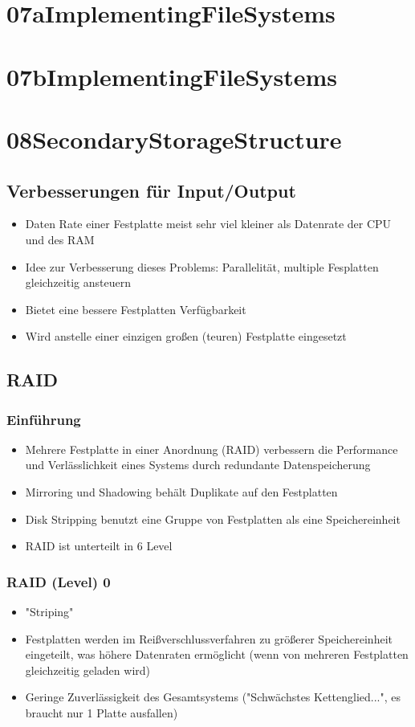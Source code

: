 \documentclass[a4paper]{scrreprt}
\begin{document}
\chapter{07aImplementingFileSystems}
\chapter{07bImplementingFileSystems}
\chapter{08SecondaryStorageStructure}
\section{Verbesserungen für Input/Output}
\begin{itemize}
	\item Daten Rate einer Festplatte meist sehr viel kleiner als Datenrate der CPU und des RAM
	\item Idee zur Verbesserung dieses Problems: Parallelität, multiple Fesplatten gleichzeitig ansteuern
	\item Bietet eine bessere Festplatten Verfügbarkeit
	\item Wird anstelle einer einzigen großen (teuren) Festplatte eingesetzt
\end{itemize}
\section{RAID}
\subsection{Einführung}
\begin{itemize}
	\item Mehrere Festplatte in einer Anordnung (RAID) verbessern die Performance und Verlässlichkeit eines Systems durch redundante Datenspeicherung
	\item Mirroring und Shadowing behält Duplikate auf den Festplatten
	\item Disk Stripping benutzt eine Gruppe von Festplatten als eine Speichereinheit
	\item RAID ist unterteilt in  6 Level
\end{itemize}	
\subsection{RAID (Level) 0}
\begin{itemize}
	\item "Striping"
	\item Festplatten werden im Reißverschlussverfahren zu größerer Speichereinheit eingeteilt, was höhere Datenraten ermöglicht (wenn von mehreren Festplatten gleichzeitig geladen wird)	
	\item Geringe Zuverlässigkeit des Gesamtsystems ("Schwächstes Kettenglied...", es braucht nur 1 Platte ausfallen)

\end{itemize}	
\end{document}
